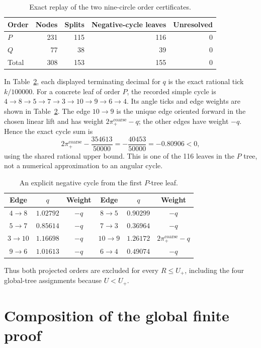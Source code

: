 \documentclass[11pt,a4paper]{article}
\theoremstyle{remark}
\newcommand{\Rcap}{U}
\begin{document}
\begin{table}[ht]
\centering
\small
\caption{Exact replay of the two nine-circle order certificates.}
\label{tab:nine-cases}
\begin{tabular}{lrrrr}
\toprule
Order & Nodes & Splits & Negative-cycle leaves & Unresolved\\
\midrule
$P$ & 231 & 115 & 116 & 0\\
$Q$ & 77 & 38 & 39 & 0\\
\midrule
Total & 308 & 153 & 155 & 0\\
\bottomrule
\end{tabular}
\end{table}
In Table~\ref{tab:negative-cycle-example}, each displayed terminating
decimal for $q$ is the exact rational tick $k/100000$.  For a concrete leaf
of order $P$, the recorded simple cycle is
$4\to8\to5\to7\to3\to10\to9\to6\to4$.  Its angle ticks and edge weights
are shown in Table~\ref{tab:negative-cycle-example}.  The edge $10\to9$ is
the unique edge oriented forward in the chosen linear lift and has weight
$2\pi_+^{\mathrm{coarse}}-q$; the other edges have weight $-q$.  Hence the
exact cycle sum is
\[
  2\pi_+^{\mathrm{coarse}}-\frac{354613}{50000}
  =-\frac{40453}{50000}=-0.80906<0,
\]
using the shared rational upper bound.  This is one of the 116 leaves in
the $P$ tree, not a numerical approximation to an angular cycle.

\begin{table}[ht]
\centering
\small
\caption{An explicit negative cycle from the first $P$-tree leaf.}
\label{tab:negative-cycle-example}
\begin{tabular}{ccc|ccc}
\toprule
Edge & $q$ & Weight & Edge & $q$ & Weight\\
\midrule
$4\to8$ & $1.02792$ & $-q$ & $8\to5$ & $0.90299$ & $-q$\\
$5\to7$ & $0.85614$ & $-q$ & $7\to3$ & $0.36964$ & $-q$\\
$3\to10$ & $1.16698$ & $-q$ & $10\to9$ & $1.26172$ & $2\pi_+^{\mathrm{coarse}}-q$\\
$9\to6$ & $1.01613$ & $-q$ & $6\to4$ & $0.49074$ & $-q$\\
\bottomrule
\end{tabular}
\end{table}
Thus both projected orders are excluded for every $R\le\Rcap_+$, including
the four global-tree assignments because $\Rcap<\Rcap_+$.

\section{Composition of the global finite proof}
\label{sec:composition}
\end{document}
